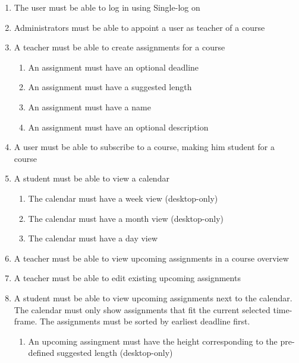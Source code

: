 \begin{enumerate}
  \item The user must be able to log in using Single-log on

  \item Administrators must be able to appoint a user as teacher of a course

  \item A teacher must be able to create assignments for a course
    \begin{enumerate}
      \item An assignment must have an optional deadline

      \item An assignment must have a suggested length

      \item An assignment must have a name

      \item An assignment must have an optional description
    \end{enumerate}

  \item A user must be able to subscribe to a course, making him student for
    a course

  \item A student must be able to view a calendar
    \begin{enumerate}
      \item The calendar must have a week view (desktop-only)

      \item The calendar must have a month view (desktop-only)

      \item The calendar must have a day view
    \end{enumerate}

  \item A teacher must be able to view upcoming assignments in a course overview

  \item A teacher must be able to edit existing upcoming assignments

  \item A student must be able to view upcoming assignments next to the calendar.
    The calendar must only show assignments that fit the current selected
    time-frame. The assignments must be sorted by earliest deadline first.
    \begin{enumerate}
      \item An upcoming assingment must have the height corresponding to the
        pre-defined suggested length (desktop-only)


\end{enumerate}
\end{enumerate}
